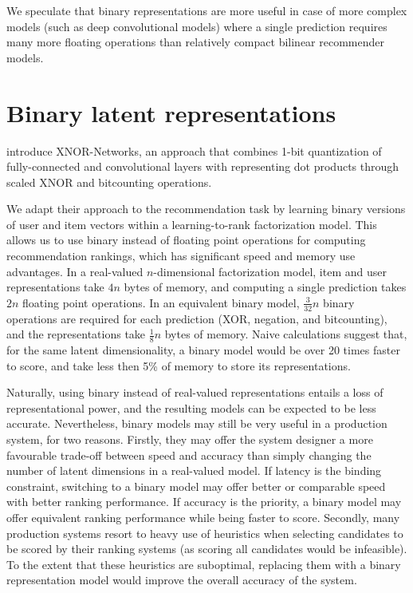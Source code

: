 \documentclass[sigchi]{acmart}
\begin{document}
We speculate that binary representations are more useful in case of more complex models (such as deep convolutional models) where a single prediction requires many more floating operations than relatively compact bilinear recommender models.


\section{Binary latent representations}
\label{sec:approach}
\citet{rastegari2016xnor} introduce XNOR-Networks, an approach that combines 1-bit quantization of fully-connected and convolutional layers with representing dot products through scaled XNOR and bitcounting operations.

We adapt their approach to the recommendation task by learning binary versions of user and item vectors within a learning-to-rank factorization model. This allows us to use binary instead of floating point operations for computing recommendation rankings, which has significant speed and memory use advantages. In a real-valued $n$-dimensional factorization model, item and user representations take $4n$ bytes of memory, and computing a single prediction takes $2n$ floating point operations. In an equivalent binary model, $\frac{3}{32}n$ binary operations are required for each prediction (XOR, negation, and bitcounting), and the representations take $\frac{1}{8}n$ bytes of memory. Naive calculations suggest that, for the same latent dimensionality, a binary model would be over 20 times faster to score, and take less then 5\% of memory to store its representations.

Naturally, using binary instead of real-valued representations entails a loss of representational power, and the resulting models can be expected to be less accurate. Nevertheless, binary models may still be very useful in a production system, for two reasons. Firstly, they may offer the system designer a more favourable trade-off between speed and accuracy than simply changing the number of latent dimensions in a real-valued model. If latency is the binding constraint, switching to a binary model may offer better or comparable speed with better ranking performance. If accuracy is the priority, a binary model may offer equivalent ranking performance while being faster to score. Secondly, many production systems resort to heavy use of heuristics when selecting candidates to be scored by their ranking systems (as scoring all candidates would be infeasible). To the extent that these heuristics are suboptimal, replacing them with a binary representation model would improve the overall accuracy of the system.
\end{document}
